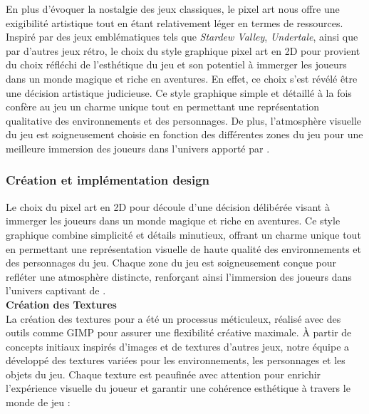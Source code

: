 En plus d'évoquer la nostalgie des jeux classiques, le pixel art nous offre une exigibilité artistique tout en étant relativement léger en termes de ressources.
Inspiré par des jeux emblématiques tels que \textit{Stardew Valley}, \textit{Undertale}, ainsi que par d'autres jeux rétro, le choix du style graphique pixel art en 2D pour 
\gameName provient du choix réfléchi de l'esthétique du jeu et son potentiel à immerger les joueurs dans un monde magique et riche en aventures.
En effet, ce choix s'est révélé être une décision artistique judicieuse.
Ce style graphique simple et détaillé à la fois confère au jeu un charme unique tout en permettant une représentation qualitative des environnements et des personnages.
De plus, l'atmosphère visuelle du jeu est soigneusement choisie en fonction des différentes zones du jeu pour une meilleure immersion des joueurs dans l'univers apporté par \gameName.
\subsubsection{Création et implémentation design}

Le choix du pixel art en 2D pour \gameName découle d'une décision délibérée visant à immerger les joueurs dans un monde magique et riche en aventures.
Ce style graphique combine simplicité et détails minutieux, offrant un charme unique tout en permettant une représentation visuelle de haute qualité des environnements et 
des personnages du jeu.
Chaque zone du jeu est soigneusement conçue pour refléter une atmosphère distincte, renforçant ainsi l'immersion des joueurs dans l'univers captivant de \gameName.
\\

\textbf{Création des Textures}
\\

La création des textures pour \gameName a été un processus méticuleux, réalisé avec des outils comme GIMP pour assurer une flexibilité créative maximale.
À partir de concepts initiaux inspirés d'images et de textures d'autres jeux, notre équipe a développé des textures variées pour les environnements, les personnages
 et les objets du jeu.
Chaque texture est peaufinée avec attention pour enrichir l'expérience visuelle du joueur et garantir une cohérence esthétique à travers le monde de jeu :
\\

